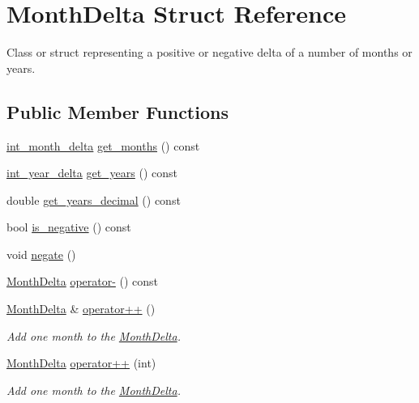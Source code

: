 \hypertarget{structMonthDelta}{\section{\-Month\-Delta \-Struct \-Reference}
\label{structMonthDelta}
}


\-Class or struct representing a positive or negative delta of a number of months or years.  


\subsection*{\-Public \-Member \-Functions}
\begin{DoxyCompactItemize}
\item 
\hyperlink{types_8h_afc803698820c39aa1ed3694de502a591}{int\-\_\-month\-\_\-delta} \hyperlink{structMonthDelta_a2359cd00364588c01724c71b223faeec}{get\-\_\-months} () const 
\item 
\hyperlink{types_8h_a6a5c8fde0b5ed80727db4db4bdd2173d}{int\-\_\-year\-\_\-delta} \hyperlink{structMonthDelta_a6e0788916adc59ac112d1f64cb42084d}{get\-\_\-years} () const 
\item 
double \hyperlink{structMonthDelta_abe185d4ea3e055f8eacab3077fbda465}{get\-\_\-years\-\_\-decimal} () const 
\item 
bool \hyperlink{structMonthDelta_a4f0b4051d92cd180ac5f9f7466a36f57}{is\-\_\-negative} () const 
\item 
void \hyperlink{structMonthDelta_a88f17c6793e3e48ac00a70e12b9045d3}{negate} ()
\item 
\hyperlink{structMonthDelta}{\-Month\-Delta} \hyperlink{structMonthDelta_a5d754349cccfb68c729461b7a96d666f}{operator-\/} () const 
\item 
\hyperlink{structMonthDelta}{\-Month\-Delta} \& \hyperlink{structMonthDelta_a2d925db7f08eb18d1dcd4961d8149b48}{operator++} ()
\begin{DoxyCompactList}\small\item\em \-Add one month to the \hyperlink{structMonthDelta}{\-Month\-Delta}. \end{DoxyCompactList}\item 
\hyperlink{structMonthDelta}{\-Month\-Delta} \hyperlink{structMonthDelta_afcbef7f90cde7cf06a312da4acd5a1b9}{operator++} (int)
\begin{DoxyCompactList}\small\item\em \-Add one month to the \hyperlink{structMonthDelta}{\-Month\-Delta}. \end{DoxyCompactList}\item 

\end{DoxyCompactItemize}
